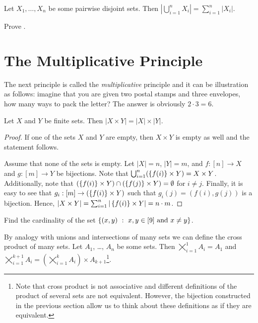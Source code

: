 \begin{corollary}
\label{corollary:additive-principle}
  Let $X_1, \dots, X_n$ be some pairwise disjoint sets. Then
  $\left|\bigcup_{i = 1}^n X_i\right| = \sum_{i = 1}^n |X_i|$.
\end{corollary}

\begin{exercise}
  Prove .
\end{exercise}


\section{The Multiplicative Principle}
The next principle is called the \textit{multiplicative} principle and it can be
illustration as follows: imagine that you are given two postal stamps and
three envelopes, how many ways to pack the letter? The answer is obviously
$2 \cdot 3 = 6$.
\begin{theorem}
  Let $X$ and $Y$ be finite sets. Then $|X \times Y| = |X| \times |Y|$.
\end{theorem}
\begin{proof}
  If one of the sets $X$ and $Y$ are empty, then $X \times Y$ is empty as well
  and the statement follows.

  Assume that none of the sets is empty. Let $|X| = n$, $|Y| = m$, and
  $f : [n] \to X$ and $g : [m] \to Y$ be bijections.
  Note that $\bigcup_{i = 1}^n (\set{f(i)} \times Y) = X \times Y$.
  Additionally, note that $(\set{f(i)} \times Y) \cap (\set{f(j)} \times Y) =
  \emptyset$ for $i \neq j$. Finally, it is easy to see that $g_i : [m] \to
  (\set{f(i)} \times Y)$ such that $g_i(j) = (f(i), g(j))$ is a bijection.
  Hence,
  $|X \times Y| = \sum_{i = 1}^n |\set{f(i)} \times Y| = n \cdot m$.
\end{proof}

\begin{exercise}
  Find the cardinality of the set
  $\set[{x, y \in [9] \text{ and } x \neq y}]{(x, y)}$.
\end{exercise}

By analogy with unions and intersections of many sets we can define the cross
product of many sets.
Let $A_1$, \dots, $A_n$ be some sets. Then $\bigtimes_{i = 1}^1 A_i = A_1$ and
$\bigtimes_{i = 1}^{k + 1} A_i =
  \left(\bigtimes_{i = 1}^k A_i\right) \times A_{k + 1}$\footnote{%
    Note that cross product is not associative and different definitions of the
    product of several sets are not equivalent. However, the bijection
    constructed in the previous section allow us to think about these
    definitions as if they are equivalent.
}.

